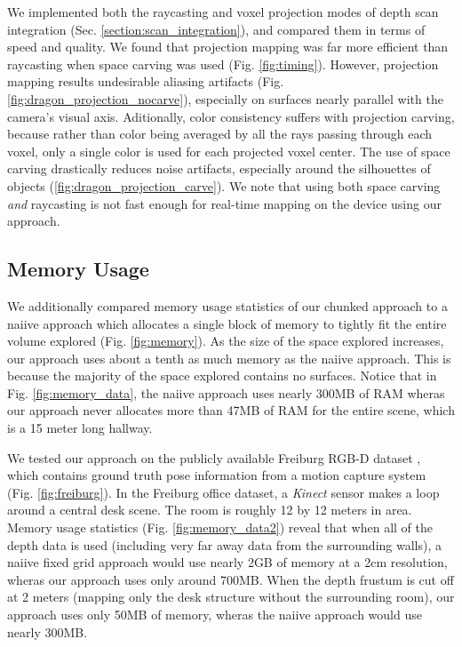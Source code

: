 \documentclass[conference,10pt]{IEEEtran}
\begin{document}
We implemented both the raycasting and voxel projection modes of depth scan
integration (Sec. \ref{section:scan_integration}), and compared them in terms of
speed and quality. We found that projection mapping was far more efficient than
raycasting when space carving was used (Fig. \ref{fig:timing}). However,
projection mapping results undesirable aliasing artifacts
(Fig. \ref{fig:dragon_projection_nocarve}), especially on surfaces nearly
parallel with the camera's visual axis. Aditionally, color consistency suffers
with projection carving, because rather than color being averaged by all the
rays passing through each voxel, only a single color is used for each projected
voxel center. The use of space carving drastically reduces noise artifacts,
especially around the silhouettes of objects
(\ref{fig:dragon_projection_carve}). We note that using both space carving
\emph{and} raycasting is not fast enough for real-time mapping on the device
using our approach.

\subsection{Memory Usage}
We additionally compared memory usage statistics of our chunked approach to a
naiive approach which allocates a single block of memory to tightly fit the
entire volume explored (Fig. \ref{fig:memory}). As the size of the space
explored increases, our approach uses about a tenth as much memory as the
naiive approach. This is because the majority of the space explored contains no
surfaces. Notice that in Fig. \ref{fig:memory_data}, the naiive approach uses
nearly 300MB of RAM wheras our approach never allocates more than 47MB of RAM
for the entire scene, which is a 15 meter long hallway.

We tested our approach on the publicly available Freiburg RGB-D dataset
\cite{FREIBURG}, which contains ground truth pose information from a motion
capture system (Fig. \ref{fig:freiburg}). In the Freiburg office dataset, a
\textit{Kinect} sensor makes a loop around a central desk scene. The room is
roughly 12 by 12 meters in area.  Memory usage statistics (Fig.
\ref{fig:memory_data2}) reveal that when all of the depth data is used
(including very far away data from the surrounding walls), a naiive fixed grid
approach would use nearly 2GB of memory at a 2cm resolution, wheras our
approach uses only around 700MB. When the depth frustum is cut off at 2 meters
(mapping only the desk structure without the surrounding room), our approach
uses only 50MB of memory, wheras the naiive approach would use nearly 300MB.
\end{document}
